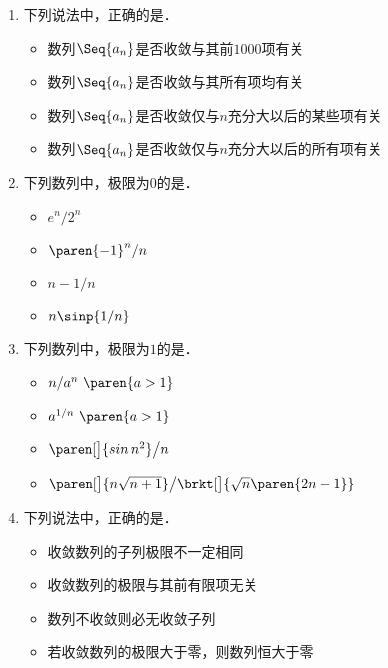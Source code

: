 \documentclass[a4paper,punct=CCT]{ctexbook}
\theoremstyle{definition}
\theoremstyle{remark}
\newif\ifshowsol
\begin{document}
\begin{enumerate}
  \ifshowsol
  选项B、C和D都是题干的充分不必要条件．例如数列\(\Seq[\big]{A + \frac{1+(-1)^n}{2}}\)不收敛于\(A\)，但是不满足选项B、C、D．实际上，选项B和D是等价的，然后选项C是选项B的充分不必要条件．
  \fi

\item 下列说法中，正确的是\uline{\makebox[10em]{}}．
  \begin{itemize}
    \renewcommand{\labelitemi}{\faCircleThin}
  \item 数列\(\Seq{a_n}\)是否收敛与其前\(1000\)项有关
  \item 数列\(\Seq{a_n}\)是否收敛与其所有项均有关
  \item 数列\(\Seq{a_n}\)是否收敛仅与\(n\)充分大以后的某些项有关
    \ifshowsol
  \item[\faCircle]
    \else
  \item
    \fi
    数列\(\Seq{a_n}\)是否收敛仅与\(n\)充分大以后的所有项有关
  \end{itemize}

\item 下列数列中，极限为\(0\)的是\uline{\makebox[6em]{}}．
  \begin{itemize}
    \renewcommand{\labelitemi}{\faCircleThin}
  \item \(e^n/2^n\)
    \ifshowsol
  \item[\faCircle]
    \else
  \item
    \fi
    \(\paren{-1}^n/n\)
  \item \(n - 1/n\)
  \item \(n \sinp{1/n}\)
  \end{itemize}

\item 下列数列中，极限为\(1\)的是\uline{\makebox[6em]{}}．
  \begin{itemize}
    \renewcommand{\labelitemi}{\faCircleThin}
  \item \(n/a^n\ \paren{a > 1}\)
    \ifshowsol
  \item[\faCircle]
    \else
  \item
    \fi
    \(a^{1/n}\ \paren{a > 1}\)
  \item \(\paren[\big]{\sin n^2}\big/{n}\)
  \item \(\paren[\big]{n \sqrt{n+1}}\big/\brkt[\big]{\sqrt n \paren{2n-1}}\)
  \end{itemize}

\item 下列说法中，正确的是\uline{\makebox[10em]{}}．
  \begin{itemize}
    \renewcommand{\labelitemi}{\faCircleThin}
  \item 收敛数列的子列极限不一定相同
    \ifshowsol
  \item[\faCircle]
    \else
  \item
    \fi
    收敛数列的极限与其前有限项无关
  \item 数列不收敛则必无收敛子列
  \item 若收敛数列的极限大于零，则数列恒大于零
  \end{itemize}


\end{enumerate}
\end{document}
